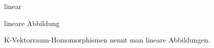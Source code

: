 \documentclass[class=article, crop=false]{standalone}
\begin{document}
\begin{zettel}{linear}

\begin{flashcard}[qky0y6gg]{lineare Abbildung}
	\begin{definition}
		K-Vektorraum-Homomorphismen nennt man lineare Abbildungen.
	\end{definition}
\end{flashcard}

\end{zettel}
\end{document}
